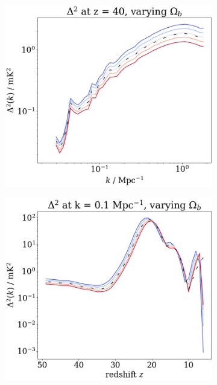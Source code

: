 \documentclass[floats,floatfix,showpacs,amssymb,prd,superscriptaddress,nofootinbib]{revtex4-2} %
\begin{document}
\begin{figure}[H]
\begin{subfigure}[b]{0.45\textwidth}
         \includegraphics[width=\textwidth]{images/simulation_results/power_spectrum_fixed_z_40_Ob.png}
         \label{fig:power_spectrum_fixed_z_40_Ob}
     \end{subfigure}
     \hfill
     \begin{subfigure}[b]{0.45\textwidth}
         \centering
         \includegraphics[width=\textwidth]{images/simulation_results/power_spectrum_fixed_k_0.1_Ob.png}
         \label{fig:power_spectrum_fixed_k_0.1_Ob}

\end{subfigure}
\end{figure}
\end{document}
